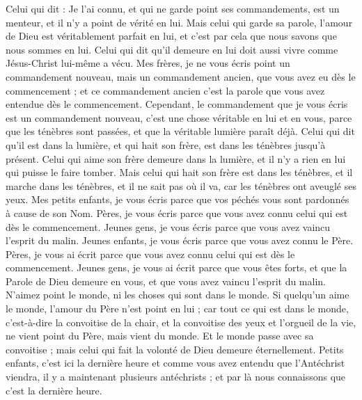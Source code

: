 \begin{multicols}{2}
Celui qui dit : Je l'ai connu, et qui ne garde point ses commandements, est un menteur, et il n'y a point de vérité en lui.
Mais celui qui garde sa parole, l'amour de Dieu est véritablement parfait en lui, et c'est par cela que nous savons que nous sommes en lui.
Celui qui dit qu'il demeure en lui doit aussi vivre comme Jésus-Christ lui-même a vécu.
Mes frères, je ne vous écris point un commandement nouveau, mais un commandement ancien, que vous avez eu dès le commencement ; et ce commandement ancien c'est la parole que vous avez entendue dès le commencement.
Cependant, le commandement que je vous écris est un commandement nouveau, c'est une chose véritable en lui et en vous, parce que les ténèbres sont passées, et que la véritable lumière paraît déjà.
Celui qui dit qu'il est dans la lumière, et qui hait son frère, est dans les ténèbres jusqu'à présent.
Celui qui aime son frère demeure dans la lumière, et il n'y a rien en lui qui puisse le faire tomber.
Mais celui qui hait son frère est dans les ténèbres, et il marche dans les ténèbres, et il ne sait pas où il va, car les ténèbres ont aveuglé ses yeux.
Mes petits enfants, je vous écris parce que vos péchés vous sont pardonnés à cause de son Nom.
Pères, je vous écris parce que vous avez connu celui qui est dès le commencement. Jeunes gens, je vous écris parce que vous avez vaincu l'esprit du malin.
Jeunes enfants, je vous écris parce que vous avez connu le Père. Pères, je vous ai écrit parce que vous avez connu celui qui est dès le commencement. Jeunes gens, je vous ai écrit parce que vous êtes forts, et que la Parole de Dieu demeure en vous, et que vous avez vaincu l'esprit du malin.
N'aimez point le monde, ni les choses qui sont dans le monde. Si quelqu'un aime le monde, l'amour du Père n'est point en lui ;
car tout ce qui est dans le monde, c'est-à-dire la convoitise de la chair, et la convoitise des yeux et l'orgueil de la vie, ne vient point du Père, mais vient du monde.
Et le monde passe avec sa convoitise ; mais celui qui fait la volonté de Dieu demeure éternellement.
Petits enfants, c'est ici la dernière heure et comme vous avez entendu que l'Antéchrist viendra, il y a maintenant plusieurs antéchrists ; et par là nous connaissons que c'est la dernière heure.

\end{multicols}
